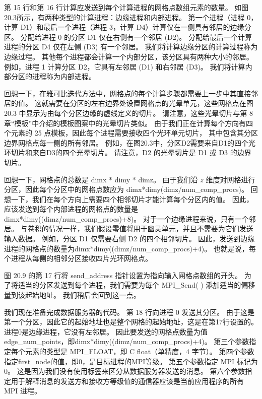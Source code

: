 第 15 行和第 16 行计算应发送到每个计算进程的网格点数组元素的数量。 
如图20.3所示，有两种类型的计算进程：边缘进程和内部进程。 
第一个进程（进程 0，计算 D1）和最后一个进程（进程 3，计算 D4）计算仅在一侧具有邻居的边缘分区。 
分配给进程 0 的分区 D1 仅在右侧有一个邻居 (D2)。 分配给最后一个计算进程的分区 D4 仅在左侧 (D3) 有一个邻居。 
我们将计算边缘分区的计算过程称为边缘过程。 其他每个进程都会计算一个内部分区，该分区具有两种大小的邻居。 
例如，进程 1 计算分区 D2，它具有左邻居 (D1) 和右邻居 (D3)。 我们将计算内部分区的进程称为内部进程。

回想一下，在雅可比迭代方法中，网格点的每个计算步骤都需要上一步中其直接邻居的值。 
这就需要在分区的左右边界处设置网格点的光晕单元，这些网格点在图 20.3 中显示为由每个分区边缘的虚线定义的切片。 
请注意，这些光晕切片与第 8 章“模板”中介绍的模板图案中的光晕切片类似。 
由于我们正在计算每个方向有四个元素的 25 点模板，因此每个进程需要接收四个光环单元切片，
其中包含其分区边界网格点每一侧的所有邻居。 例如，在图20.3中，分区D2需要来自D1的四个光环切片和来自D3的四个光晕切片。 
请注意，D2 的光晕切片是 D1 或 D3 的边界切片。

回想一下，网格点的总数是 dimx * dimy * dimz。 
由于我们沿 $z$ 维度对网格进行分区，因此每个分区中的网格点数应为 dimx*dimy(dimz/num\_comp\_procs)。 
回想一下，我们在每个方向上需要四个相邻切片才能计算每个分区内的值。 
因此，应该发送到每个内部进程的网格点的数量是dimx*dimy((dimz/num\_comp\_procs)+8)。 
对于一个边缘进程来说，只有一个邻居。 与卷积的情况一样，我们假设零值将用于幽灵单元，并且不需要为它们发送输入数据。 
例如，分区 D1 仅需要右侧 D2 的四个相邻切片。 
因此，发送到边缘进程的网格点的数量为dimx*dimy((dimz/num\_comp\_procs)+4)。 
也就是说，每个进程从每侧的相邻分区接收四片光环网格点。

图 20.9 的第 17 行将 send\_address 指针设置为指向输入网格点数组的开头。 
为了将适当的分区发送到每个进程，我们需要为每个 MPI\_Send( ) 添加适当的偏移量到该起始地址。 我们稍后会回到这一点。

我们现在准备完成数据服务器的代码。 第 18 行向进程 0 发送其分区。 
由于这是第一个分区，因此它的起始地址也是整个网格的起始地址，这是在第17行设置的。进程0是边缘进程，它没有左邻居。 
因此要发送的网格点数量为值edge\_num\_points，即dimx*dimy((dimz/num\_comp\_procs)+4)。 
第三个参数指定每个元素的类型是 MPI\_FLOAT，即 C float（单精度，4 字节）。 
第四个参数指定first\_node的值，即0，是目标进程的MPI等级。 第五个参数指定 MPI 标记为 0。 
这是因为我们没有使用标签来区分从数据服务器发送的消息。 
第六个参数指定用于解释消息的发送方和接收方等级值的通信器应该是当前应用程序的所有 MPI 进程。

